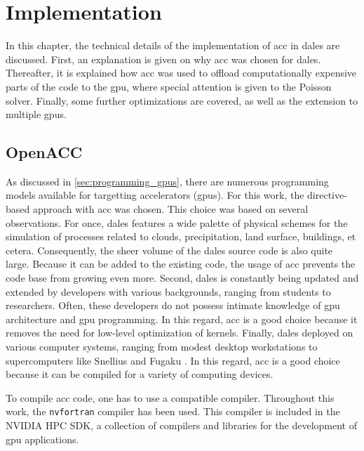 \chapter{Implementation} \label{chap:implementation}
In this chapter, the technical details of the implementation of \acrshort{acc} in \acrshort{dales} are discussed. First, an explanation is given on why \acrshort{acc} was chosen for \acrshort{dales}. Thereafter, it is explained how \acrshort{acc} was used to offload computationally expensive parts of the code to the \acrshort{gpu}, where special attention is given to the Poisson solver. Finally, some further optimizations are covered, as well as the extension to multiple \acrshort{gpu}s.

\section{OpenACC}
As discussed in \autoref{sec:programming_gpus}, there are numerous programming models available for targetting accelerators (\acrshort{gpu}s). For this work, the directive-based approach with \acrshort{acc} was chosen. This choice was based on several observations. For once, \acrshort{dales} features a wide palette of physical schemes for the simulation of processes related to clouds, precipitation, land surface, buildings, et cetera. Consequently, the sheer volume of the \acrshort{dales} source code is also quite large. Because it can be added to the existing code, the usage of \acrshort{acc} prevents the code base from growing even more. Second, \acrshort{dales} is constantly being updated and extended by developers with various backgrounds, ranging from students to researchers. Often, these developers do not possess intimate knowledge of \acrshort{gpu} architecture and \acrshort{gpu} programming. In this regard, \acrshort{acc} is a good choice because it removes the need for low-level optimization of kernels. Finally, \acrshort{dales} deployed on various computer systems, ranging from modest desktop workstations to supercomputers like Snellius and Fugaku \citep{janssonCloudBotanyShallow2023}. In this regard, \acrshort{acc} is a good choice because it can be compiled for a variety of computing devices.

To compile \acrshort{acc} code, one has to use a compatible compiler. Throughout this work, the \texttt{nvfortran} compiler has been used. This compiler is included in the NVIDIA HPC SDK, a collection of compilers and libraries for the development of \acrshort{gpu} applications. 

